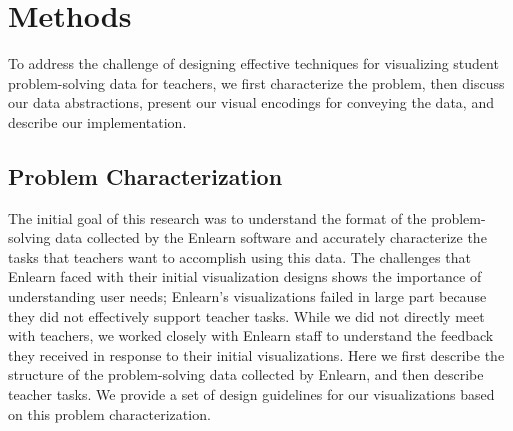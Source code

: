 \documentclass{sigchi}
\begin{document}



\section{Methods}
To address the challenge of designing effective techniques for visualizing student problem-solving data for teachers, we first characterize the problem, then discuss our data abstractions, present our visual encodings for conveying the data, and describe our implementation.


\subsection{Problem Characterization}
The initial goal of this research was to understand the format of the problem-solving data collected by the Enlearn software and accurately characterize the tasks that teachers want to accomplish using this data. The challenges that Enlearn faced with their initial visualization designs shows the importance of understanding user needs; Enlearn's visualizations failed in large part because they did not effectively support teacher tasks. While we did not directly meet with teachers, we worked closely with Enlearn staff to understand the feedback they received in response to their initial visualizations. Here we first describe the structure of the problem-solving data collected by Enlearn, and then describe teacher tasks. We provide a set of design guidelines for our visualizations based on this problem characterization.
\end{document}
